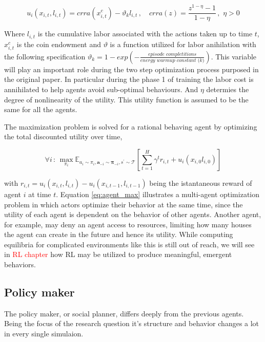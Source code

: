 \begin{equation}
u_i(x_{i,t}, l_{i,t}) = crra(x_{i,t}^c) - \vartheta_k l_{i,t}\,, \quad crra(z) = \frac{z^{1- \eta}-1}{1-\eta}\,,\,\, \eta > 0
\end{equation}

Where \( l_{i,t} \) is the cumulative labor associated with the actions taken up to time \( t \), \( x_{i,t}^c \) is the coin endowment and \( \vartheta \) is a function utilized for labor anihilation with the following specification \( \vartheta_k = 1- exp\left(- \frac{\textit{episode completitions}}{\textit{energy warmup constant (k)}}\right)\). This variable will play an important role during the two step optimization process purposed in the original paper. In particular during the phase 1 of training the labor cost is annihilated to help agents avoid sub-optimal behaviours. And \( \eta \) determies the degree of nonlinearity of the utility. This utility function is assumed to be the same for all the agents.

The maximization problem is solved for a rational behaving agent by optimizing the total discounted utility over time,

\begin{equation}
\forall i \,:\, \max_{\pi_i}\mathbb{E}_{a_i \sim \pi_i, \boldsymbol{a}_{-i} \sim \boldsymbol{\pi}_{-i}, s^{'}\sim\mathcal{T}}\left[ \sum_{t=1}^H \gamma^t r_{i,t} + u_i({x_{i,0}l_{i,0}})\right]
\label{eq:agent_max}
\end{equation}


with \( r_{i,t} = u_i(x_{i,t},l_{i,t})  - u_i(x_{i,t-1},l_{i,t-1}) \) being the istantaneous reward of agent \( i \) at time \( t \). Equation \ref{eq:agent_max} illustrates a multi-agent optimization problem in which actors optimize their behavior at the same time, since the utility of each agent is dependent on the behavior of other agents. Another agent, for example, may deny an agent access to resources, limiting how many houses the agent can create in the future and hence its utility. While computing equilibria for complicated environments like this is still out of reach, we will see in \textcolor{red}{RL chapter} how RL may be utilized to produce meaningful, emergent behaviors.


\subsection{Policy maker}

The policy maker, or social planner, differs deeply from the previous agents. Being the focus of the research question it's structure and behavior changes a lot in every single simulaion. 

